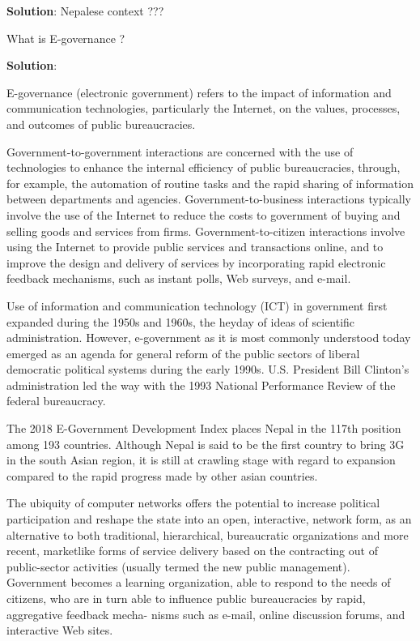 \documentclass[
]{book}
\newcommand{\question}{\item}
\newenvironment{solution}{ {\bfseries Solution}:}{}
\begin{document}
\begin{questions}
\begin{solution}
Nepalese context ???

\end{solution}

\question What is E-governance ?

\begin{solution}

E-governance (electronic government) refers to the impact of information and communication technologies, particularly the Internet, on the values, processes, and outcomes of public bureaucracies.

Government-to-government interactions are concerned with the use of technologies to enhance the internal efficiency of public bureaucracies, through, for example, the automation of routine tasks and the rapid sharing of information between departments and agencies. Government-to-business interactions typically involve the use of the Internet to reduce the costs to government of buying and selling goods and services from firms. Government-to-citizen interactions involve using the Internet to provide public services and transactions online, and to improve the design and delivery of services by incorporating rapid electronic feedback mechanisms, such as instant polls, Web surveys, and e-mail.

Use of information and communication technology (ICT) in government first expanded during the 1950s and 1960s, the heyday of ideas of scientific administration. However, e-government as it is most commonly understood today emerged as an agenda for general reform of the public sectors of liberal democratic political systems during the early 1990s. U.S. President Bill Clinton's administration led the way with the 1993 National Performance Review of the federal bureaucracy.

The 2018 E-Government Development Index places Nepal in the 117th position among 193 countries. Although Nepal is said to be the first country to bring 3G in the south Asian region, it is still at crawling stage with regard to expansion compared to the rapid progress made by other asian countries.

The ubiquity of computer networks offers the potential to increase political participation and reshape the state into an open, interactive, network form, as an alternative to both traditional, hierarchical, bureaucratic organizations and more recent, marketlike forms of service delivery based on the contracting out of public-sector activities (usually termed the new public management). Government becomes a learning organization, able to respond to the needs of citizens, who are in turn able to influence public bureaucracies by rapid, aggregative feedback mecha- nisms such as e-mail, online discussion forums, and interactive Web sites.


\end{solution}
\end{questions}
\end{document}
